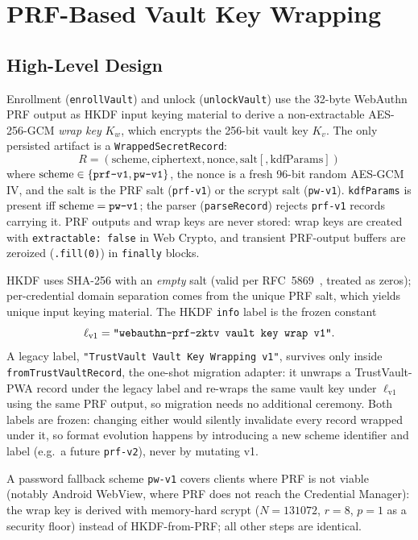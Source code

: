 \documentclass[runningheads]{llncs}
\begin{document}
\section{PRF-Based Vault Key Wrapping}
\subsection{High-Level Design}
Enrollment (\texttt{enrollVault}) and unlock (\texttt{unlockVault}) use the 32-byte WebAuthn PRF output as HKDF input keying material to derive a non-extractable AES-256-GCM \emph{wrap key} $K_w$, which encrypts the 256-bit vault key $K_v$.
The only persisted artifact is a \texttt{WrappedSecretRecord}:
\[
  R = (\mathrm{scheme}, \mathrm{ciphertext}, \mathrm{nonce}, \mathrm{salt}[, \mathrm{kdfParams}])
\]
where $\mathrm{scheme} \in \{\text{\texttt{prf-v1}}, \text{\texttt{pw-v1}}\}$, the nonce is a fresh 96-bit random AES-GCM IV, and the salt is the PRF salt (\texttt{prf-v1}) or the scrypt salt (\texttt{pw-v1}).
\texttt{kdfParams} is present iff $\mathrm{scheme}=\text{\texttt{pw-v1}}$; the parser (\texttt{parseRecord}) rejects \texttt{prf-v1} records carrying it.
PRF outputs and wrap keys are never stored: wrap keys are created with \texttt{extractable:\,false} in Web Crypto, and transient PRF-output buffers are zeroized (\texttt{.fill(0)}) in \texttt{finally} blocks.

HKDF uses SHA-256 with an \emph{empty} salt (valid per RFC~5869~\cite{rfc5869}, treated as zeros); per-credential domain separation comes from the unique PRF salt, which yields unique input keying material.
The HKDF \texttt{info} label is the frozen constant
\[
  \ell_{\mathrm{v1}} = \text{\texttt{"webauthn-prf-zktv vault key wrap v1"}}.
\]
A legacy label, \texttt{"TrustVault Vault Key Wrapping v1"}, survives only inside \texttt{fromTrustVaultRecord}, the one-shot migration adapter: it unwraps a TrustVault-PWA record under the legacy label and re-wraps the same vault key under $\ell_{\mathrm{v1}}$ using the same PRF output, so migration needs no additional ceremony.
Both labels are frozen: changing either would silently invalidate every record wrapped under it, so format evolution happens by introducing a new scheme identifier and label (e.g.\ a future \texttt{prf-v2}), never by mutating v1.

A password fallback scheme \texttt{pw-v1} covers clients where PRF is not viable (notably Android WebView, where PRF does not reach the Credential Manager): the wrap key is derived with memory-hard scrypt ($N{=}131072$, $r{=}8$, $p{=}1$ as a security floor) instead of HKDF-from-PRF; all other steps are identical.
\end{document}
